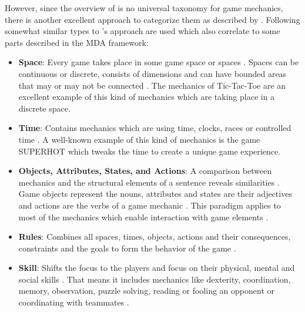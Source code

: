 \documentclass[MGS,Master,english]{twbook}%
\begin{document}
However, since the overview of \citep{gameDesign::gameMechanicsAdvancedGameDesign} is no universal taxonomy for game mechanics, there is another excellent approach to categorize them as described by \cite{gameDesign::bookOfLenses}. Following somewhat similar types to 's approach are used which also correlate to some parts described in the \ac{MDA} framework:
\begin{itemize}
	\item \textbf{Space}: Every game takes place in some game space or spaces \cite{gameDesign::bookOfLenses}. Spaces can be continuous or discrete, consists of dimensions and can have bounded areas that may or may not be connected \cite{gameDesign::bookOfLenses}. The mechanics of Tic-Tac-Toe are an excellent example of this kind of mechanics which are taking place in a discrete space. 
	\item \textbf{Time}: Contains mechanics which are using time, clocks, races or controlled time \cite{gameDesign::bookOfLenses}. A well-known example of this kind of mechanics is the game SUPERHOT \cite{game::superhot} which tweaks the time to create a unique game experience.
	\item \textbf{Objects, Attributes, States, and Actions}: A comparison between mechanics and the structural elements of a sentence reveals similarities \cite{gameDesign::bookOfLenses}. Game objects represent the nouns, attributes and states are their adjectives and actions are the verbs of a game mechanic \cite{gameDesign::bookOfLenses}. This paradigm applies to most of the mechanics which enable interaction with game elements \cite{gameDesign::bookOfLenses}. 
	\item \textbf{Rules}: Combines all spaces, times, objects, actions and their consequences, constraints and the goals to form the behavior of the game \cite{gameDesign::bookOfLenses}. 
	\item \textbf{Skill}: Shifts the focus to the players and focus on their physical, mental and social skills \cite{gameDesign::bookOfLenses}. That means it includes mechanics like dexterity, coordination, memory, observation, puzzle solving, reading or fooling an opponent or coordinating with teammates \cite{gameDesign::bookOfLenses}.  
\end{itemize}

\end{document}
